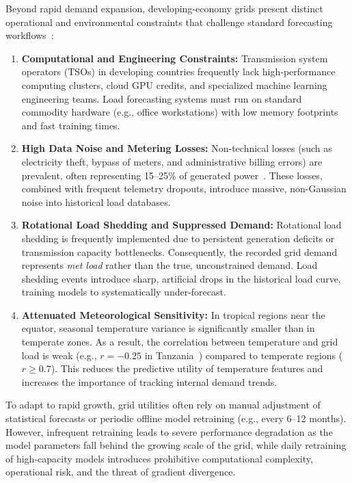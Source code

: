 \documentclass[10pt,twocolumn,letterpaper]{article}
\begin{document}
Beyond rapid demand expansion, developing-economy grids present distinct operational and environmental constraints that challenge standard forecasting workflows~\cite{mvungi2021load}:
\begin{enumerate}
    \item \textbf{Computational and Engineering Constraints:} Transmission system operators (TSOs) in developing countries frequently lack high-performance computing clusters, cloud GPU credits, and specialized machine learning engineering teams. Load forecasting systems must run on standard commodity hardware (e.g., office workstations) with low memory footprints and fast training times.
    \item \textbf{High Data Noise and Metering Losses:} Non-technical losses (such as electricity theft, bypass of meters, and administrative billing errors) are prevalent, often representing 15--25\% of generated power~\cite{daut2017building}. These losses, combined with frequent telemetry dropouts, introduce massive, non-Gaussian noise into historical load databases.
    \item \textbf{Rotational Load Shedding and Suppressed Demand:} Rotational load shedding is frequently implemented due to persistent generation deficits or transmission capacity bottlenecks. Consequently, the recorded grid demand represents \emph{met load} rather than the true, unconstrained demand. Load shedding events introduce sharp, artificial drops in the historical load curve, training models to systematically under-forecast.
    \item \textbf{Attenuated Meteorological Sensitivity:} In tropical regions near the equator, seasonal temperature variance is significantly smaller than in temperate zones. As a result, the correlation between temperature and grid load is weak (e.g., $r = -0.25$ in Tanzania~\cite{mvungi2021load}) compared to temperate regions ($r \ge 0.7$). This reduces the predictive utility of temperature features and increases the importance of tracking internal demand trends.
\end{enumerate}

To adapt to rapid growth, grid utilities often rely on manual adjustment of statistical forecasts or periodic offline model retraining (e.g., every 6--12 months). However, infrequent retraining leads to severe performance degradation as the model parameters fall behind the growing scale of the grid, while daily retraining of high-capacity models introduces prohibitive computational complexity, operational risk, and the threat of gradient divergence.
\end{document}
